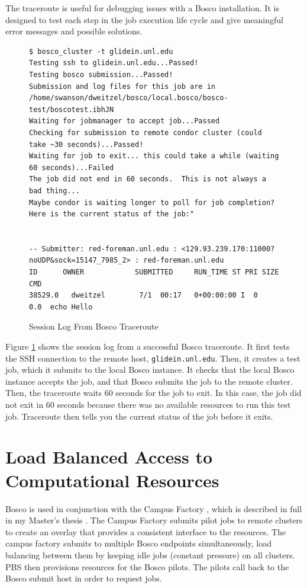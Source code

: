 The traceroute is useful for debugging issues with a Bosco installation.  It is designed to test each step in the job execution life cycle and give meaningful error messages and possible solutions.

\begin{figure}[h!t]
\begin{lstlisting}[basicstyle=\scriptsize\ttfamily]
$ bosco_cluster -t glidein.unl.edu
Testing ssh to glidein.unl.edu...Passed!
Testing bosco submission...Passed!
Submission and log files for this job are in /home/swanson/dweitzel/bosco/local.bosco/bosco-test/boscotest.ibhJN
Waiting for jobmanager to accept job...Passed
Checking for submission to remote condor cluster (could take ~30 seconds)...Passed!
Waiting for job to exit... this could take a while (waiting 60 seconds)...Failed
The job did not end in 60 seconds.  This is not always a bad thing...
Maybe condor is waiting longer to poll for job completion?
Here is the current status of the job:"


-- Submitter: red-foreman.unl.edu : <129.93.239.170:11000?noUDP&sock=15147_7985_2> : red-foreman.unl.edu
ID      OWNER            SUBMITTED     RUN_TIME ST PRI SIZE CMD               
38529.0   dweitzel        7/1  00:17   0+00:00:00 I  0   0.0  echo Hello   
\end{lstlisting}
\caption{Session Log From Bosco Traceroute}
\label{lst:boscotraceroute}
\end{figure}

Figure \ref{lst:boscotraceroute} shows the session log from a successful Bosco traceroute.  It first tests the SSH connection to the remote host, \texttt{glidein.unl.edu}.  Then, it creates a test job, which it submits to the local Bosco instance.  It checks that the local Bosco instance accepts the job, and that Bosco submits the job to the remote cluster.  Then, the traceroute waits 60 seconds for the job to exit.  In this case, the job did not exit in 60 seconds because there was no available resources to run this test job.  Traceroute then tells you the current status of the job before it exits.


\section{Load Balanced Access to Computational Resources}

Bosco is used in conjunction with the Campus Factory \cite{website:campusfactory}, which is described in full in my Master's thesis \cite{weitzel2011campus}.  The Campus Factory submits pilot jobs to remote clusters to create an overlay that provides a consistent interface to the resources.  The campus factory submits to multiple Bosco endpoints simultaneously, load balancing between them by keeping idle jobs (constant pressure) on all clusters.  PBS then provisions resources for the Bosco pilots.  The pilots call back to the Bosco submit host in order to request jobs.

